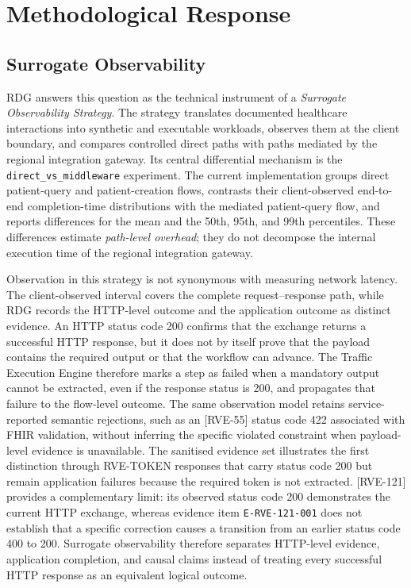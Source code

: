 \section{Methodological Response}
\label{sec:methodological-response}

\subsection{Surrogate Observability}
\noindent RDG answers this question as the technical
instrument of a \emph{Surrogate Observability Strategy}. The strategy translates
documented healthcare interactions into synthetic and executable workloads,
observes them at the client boundary, and compares controlled direct paths with 
paths mediated by the regional integration gateway. Its central differential mechanism is the
\texttt{direct\_\allowbreak vs\_\allowbreak middleware} experiment. The current
implementation groups direct patient-query and patient-creation flows, contrasts
their client-observed end-to-end completion-time distributions with the mediated
patient-query flow, and reports differences for the mean and the 50th, 95th, and
99th percentiles. These differences estimate \emph{path-level overhead};
they do not decompose the internal execution time of the regional integration gateway.

\noindent Observation in this strategy is not synonymous with measuring network
latency. The client-observed interval covers the complete request--response path,
while RDG records the HTTP-level outcome and the application outcome as distinct
evidence. An HTTP status code 200 confirms that the exchange returns a successful
HTTP response, but it does not by itself prove that the payload contains the
required output or that the workflow can advance. The Traffic Execution Engine therefore
marks a step as failed when a mandatory output cannot be extracted, even if the
response status is 200, and propagates that failure to the flow-level outcome. The
same observation model retains service-reported semantic rejections, such as an
[RVE-55] status code 422 associated with FHIR validation, without inferring the
specific violated constraint when payload-level evidence is unavailable. The
sanitised evidence set illustrates the first distinction through RVE-TOKEN responses that carry status code 200 but remain application
failures because the required token is not extracted. [RVE-121] provides a
complementary limit: its observed status code 200 demonstrates the current HTTP
exchange, whereas evidence item \texttt{E-RVE-121-001} does not establish that a
specific correction causes a transition from an earlier status code 400 to 200.
Surrogate observability therefore separates HTTP-level evidence, application
completion, and causal claims instead of treating every successful HTTP response
as an equivalent logical outcome.

